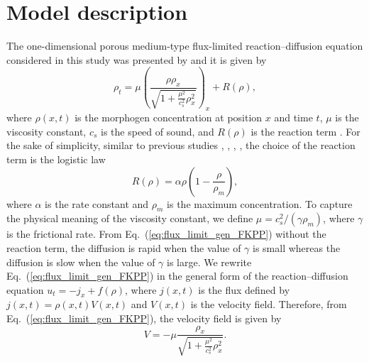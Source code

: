 \documentclass[jkps,preprint,fleqn,showpacs,showkeys]{revtex4}
\newcommand{\eq}[1]{Eq.~(\ref{#1})}
\begin{document}
\section{Model description \label{sec:Model}}
The one-dimensional porous medium-type flux-limited reaction--diffusion equation considered in this study was presented by \cite{Campos2016} and it is given by
\begin{equation}\label{eq:flux_limit_gen_FKPP}
\rho_t = \mu\left(\frac{\rho\rho_x}{\sqrt{1+\frac{\mu^2}{c_s^2}\rho_x^2}}\right)_x + R(\rho),
\end{equation}
where $\rho(x,t)$ is the morphogen concentration at position $x$ and time $t$, $\mu$ is the viscosity constant, $c_s$ is the speed of sound, and $R(\rho)$ is the reaction term \cite{Campos2016}. For the sake of simplicity, similar to previous studies \cite{Andreu2010AFisher}, \cite{Campos2013ontheanalysis}, \cite{Calvo2016pattern}, \cite{Campos2016}, the choice of the reaction term is the logistic law
\begin{equation}\label{eq:reaction}
R(\rho) = \alpha\rho\left(1-\frac{\rho}{\rho_m}\right),
\end{equation}
where $\alpha$ is the rate constant and $\rho_m$ is the maximum concentration. To capture the physical meaning of the viscosity constant, we define $\mu = c_s^2/(\gamma\rho_m)$, where $\gamma$ is the frictional rate. From \eq{eq:flux_limit_gen_FKPP} without the reaction term, the diffusion is rapid when the value of $\gamma$ is small whereas the diffusion is slow when the value of $\gamma$ is large. We rewrite \eq{eq:flux_limit_gen_FKPP} in the general form of the reaction--diffusion equation $u_t = -j_x + f(\rho)$, where $j(x,t)$ is the flux defined by $j(x,t) = \rho(x,t) V(x,t)$ and $V(x,t)$ is the velocity field. Therefore, from \eq{eq:flux_limit_gen_FKPP}, the velocity field is given by
\begin{equation}\label{eq:velocity_real}
V = -\mu\frac{\rho_x}{\sqrt{1+\frac{\mu^2}{c_s^2}\rho_x^2}}.
\end{equation}
\end{document}
